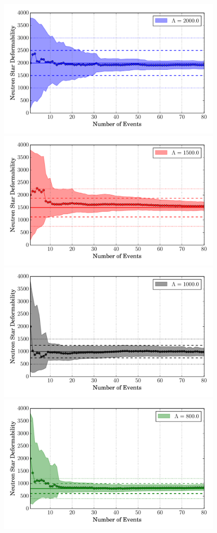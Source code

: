 \documentclass[aps,prd,amsmath,floats,floatfix, twocolumn,
superscriptaddress,nofootinbib,showpacs]{revtex4-1}
\begin{document}
\begin{figure}
\centering    
\includegraphics[width=.9\columnwidth]{plots/FillBetweenErrorBarsLambda_vs_N_L2000.pdf}
\includegraphics[width=.9\columnwidth]{plots/FillBetweenErrorBarsLambda_vs_N_L1500.pdf}\\
\includegraphics[width=.67\columnwidth]{plots/FillBetweenErrorBarsLambda_vs_N_L1000.pdf}
\includegraphics[width=.67\columnwidth]{plots/FillBetweenErrorBarsLambda_vs_N_L800.pdf}

\end{figure}
\end{document}
